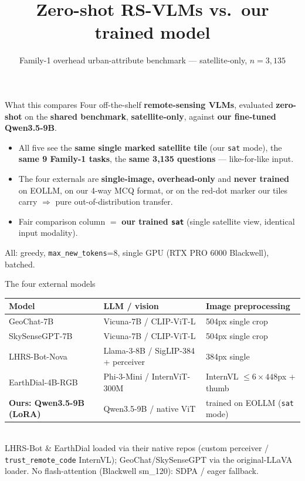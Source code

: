 \documentclass[aspectratio=169]{beamer}
\title{Zero-shot RS-VLMs vs.\ our trained model}
\subtitle{Family-1 overhead urban-attribute benchmark --- satellite-only, $n=3{,}135$}
\date{}\author{}
\begin{document}
\maketitle

\begin{frame}{What this compares}
\small
Four off-the-shelf \textbf{remote-sensing VLMs}, evaluated \textbf{zero-shot} on the
\textbf{shared benchmark}, \textbf{satellite-only}, against \textbf{our fine-tuned
Qwen3.5-9B}.
\begin{itemize}
\item All five see the \textbf{same single marked satellite tile} (our \texttt{sat} mode),
  the \textbf{same 9 Family-1 tasks}, the \textbf{same 3{,}135 questions} --- like-for-like input.
\item The four externals are \textbf{single-image, overhead-only} and \textbf{never trained}
  on EOLLM, on our 4-way MCQ format, or on the red-dot marker our tiles carry
  $\Rightarrow$ pure out-of-distribution transfer.
\item Fair comparison column $=$ \textbf{our trained \texttt{sat}} (single satellite view,
  identical input modality).
\end{itemize}
\vspace{4pt}
\footnotesize All: greedy, \texttt{max\_new\_tokens}=8, single GPU (RTX PRO 6000 Blackwell), batched.
\end{frame}

\begin{frame}{The four external models}
\centering\scriptsize
\begin{tabular}{lll}
\toprule
Model & LLM / vision & Image preprocessing \\
\midrule
GeoChat-7B & Vicuna-7B / CLIP-ViT-L & 504px single crop \\
SkySenseGPT-7B & Vicuna-7B / CLIP-ViT-L & 504px single crop \\
LHRS-Bot-Nova & Llama-3-8B / SigLIP-384 + perceiver & 384px single \\
EarthDial-4B-RGB & Phi-3-Mini / InternViT-300M & InternVL $\le6\times448$px + thumb \\
\midrule
\textcolor{ours}{\textbf{Ours: Qwen3.5-9B (LoRA)}} & \textcolor{ours}{Qwen3.5-9B / native ViT} & \textcolor{ours}{trained on EOLLM (\texttt{sat} mode)} \\
\bottomrule
\end{tabular}\\[8pt]
\footnotesize LHRS-Bot \& EarthDial loaded via their native repos (custom perceiver /
\texttt{trust\_remote\_code} InternVL); GeoChat/SkySenseGPT via the original-LLaVA loader.
No flash-attention (Blackwell sm\_120): SDPA / eager fallback.
\end{frame}
\end{document}
